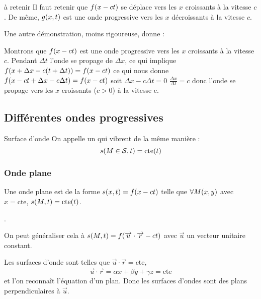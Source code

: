 \documentclass[a4paper,french,bookmarks]{book}
\begin{document}
    \begin{form}{à retenir}{}
        Il faut retenir que $f\!\left(x - ct\right)$ se déplace vers les $x$ croissants à la vitesse $c$.
    De même, $g\!\left(x, t\right)$ est une onde progressive vers les $x$ décroissants à la vitesse $c$.
    \end{form}
    
    Une autre démonstration, moins rigoureuse, donne :
    \begin{nproof}
        Montrons que $f\!\left(x - ct\right)$ est une onde progressive vers les $x$ croissants à la vitesse $c$. Pendant $\Delta t$ l'onde se propage de $\Delta x$, ce qui implique $f\!\left(x + \Delta x - c \!\left(t + \Delta t\right)\right) = f\!\left(x - ct\right)$ ce qui nous donne $f\!\left(x - ct + \Delta x - c \Delta t\right) = f(x - ct)$ soit $\Delta x - c \Delta t = 0$
        $\frac{\Delta x}{\Delta t} = c$ donc l'onde se propage vers les $x$ croissants ($c > 0$) à la vitesse c.
    \end{nproof}

    \subsection{Différentes ondes progressives}

    \begin{definition}{Surface d'onde}{}
        On appelle  un  qui vibrent de la même manière :
        \[ s\!\left(M \in \mathcal{S}, t\right) = \text{cte}\!\left(t\right)\]
    \end{definition}
    
    \subsubsection{Onde plane}
    \begin{example}{}{}
        Une onde plane est de la forme $s\!\left(x, t\right) = f\!\left(x - ct\right)$ telle que $\forall M\!\left(x, y\right)$ avec $x = \text{cte}$, $s\!\left(M, t\right) = \text{cte}\!\left(t\right)$.
      
        \begin{enumerate}
            \itt {}.
        \end{enumerate}
        
        On peut généraliser cela à $s\!\left(M, t\right) = f\!\left(\overrightarrow{u} \cdot \overrightarrow{r} - ct\right)$ avec $\vec{u}$ un vecteur unitaire constant.
    
        Les surfaces d'onde sont telles que $\vec u \cdot \vec r = \text{cte}$, \ie
        \[ \vec u \cdot \vec r = \alpha x + \beta y + \gamma z = \text{cte} \]
        et l'on reconnaît l'équation d'un plan. Donc les surfaces d'ondes sont des plans perpendiculaires à $\vec{u}$.
    \end{example}
    
\end{document}
